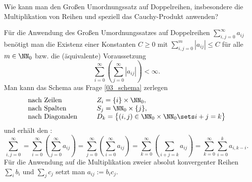 \begin{frage}
  Wie kann man den Großen Umordnungssatz auf Doppelreihen, 
  insbesondere die Multiplikation von Reihen und speziell das 
  Cauchy-Produkt anwenden?
\end{frage}

\begin{antwort}
  Für die Anwendung des Großen Umordnungssatzes auf Doppelreihen 
  $\sum_{i,j=0}^\infty a_{ij}$ benötigt man die Existenz einer Konstanten 
  $C\ge 0$ mit $\sum_{i,j=0}^m |a_{ij}|\le C$ für alle $m\in\NN_0$ bzw. die 
  (äquivalente) Voraussetzung 
  \[
  \sum_{i=0}^\infty \left( \sum_{j=0}^\infty |a_{ij}| \right) < \infty.
  \]
  Man kann das Schema aus Frage \ref{03_schema} zerlegen 
  \[
  \begin{array}{lp{3mm}l}
    \text{nach Zeilen} & & Z_i = \{ i \} \times \NN_0, \\
    \text{nach Spalten} & & S_j = \NN_0 \times \{ j \}, \\
    \text{nach Diagonalen} & & D_k = \big\{ (i,j) \in \NN_0\times \NN_0 \sets 
    i+j=k \big\}
  \end{array}
  \]
  und erhält den :
  \[
  \sum_{i,j=0}^\infty =  
  \sum_{i=0}^\infty \left( \sum_{j=0}^\infty a_{ij} \right) =
  \sum_{j=0}^\infty \left( \sum_{i=0}^\infty a_{ij} \right) =
  \sum_{k=0}^\infty \left( \sum_{i+j=k} a_{ij} \right) = 
  \sum_{k=0}^\infty \sum_{i=0}^k a_{i,k-i}.
  \]
  Für die Anwendung auf die Multiplikation zweier absolut konvergenter Reihen 
  $\sum_i b_i $ und $\sum_j c_j $ setzt man $a_{ij} := b_i c_j$. \AntEnd 
\end{antwort}